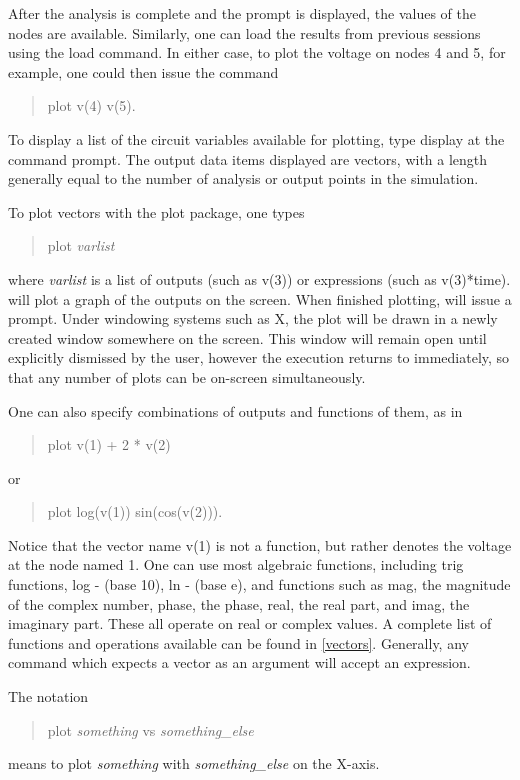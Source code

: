 After the analysis is complete and the {\WRspice} prompt is displayed,
the values of the nodes are available. Similarly, one can load the
results from previous {\WRspice} sessions using the {\cb load} command.  In
either case, to plot the voltage on nodes 4 and 5, for example, one
could then issue the command
\begin{quote}\vt
plot v(4) v(5).
\end{quote}
To display a list of the circuit variables available for plotting,
type {\vt display} at the command prompt.  The output data items
displayed are vectors, with a length generally equal to the number of
analysis or output points in the simulation.

To plot vectors with the {\cb plot} package, one types
\begin{quote}\vt
plot {\it varlist}
\end{quote}
where {\it varlist} is a list of outputs (such as {\vt v(3)}) or
expressions (such as {\vt v(3)*time}).  {\WRspice} will plot a graph of
the outputs on the screen.  When finished plotting, {\WRspice} will
issue a prompt.  Under windowing systems such as X, the plot will be
drawn in a newly created window somewhere on the screen.  This window
will remain open until explicitly dismissed by the user, however the
execution returns to {\WRspice} immediately, so that any number of
plots can be on-screen simultaneously.

One can also specify combinations of outputs and functions of them, as in
\begin{quote}\vt
plot v(1) + 2 * v(2)
\end{quote}
or
\begin{quote}\vt
plot log(v(1)) sin(cos(v(2))).
\end{quote}
Notice that the vector name {\vt v(1)} is not a function, but rather
denotes the voltage at the node named 1.  One can use most algebraic
functions, including trig functions, {\vt log} - (base 10), {\vt
ln} - (base e), and functions such as {\vt mag}, the magnitude of
the complex number, {\vt phase}, the phase, {\vt real}, the real
part, and {\vt imag}, the imaginary part.  These all operate on real
or complex values.  A complete list of functions and operations
available can be found in \ref{vectors}.  Generally, any command which
expects a vector as an argument will accept an expression.

The notation
\begin{quote}\vt
plot {\it something} vs {\it something\_else}
\end{quote}
means to plot {\it something} with {\it something\_else} on the
X-axis.

